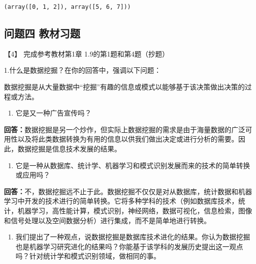 \documentclass[11pt]{article}
\makeatletter
\providecommand{\tightlist}{%
      \setlength{\itemsep}{0pt}\setlength{\parskip}{0pt}}
\newcommand{\boxspacing}{\kern\kvtcb@left@rule\kern\kvtcb@boxsep}
\newcommand{\prompt}[4]{
        \ttfamily\llap{{\color{#2}[#3]:\hspace{3pt}#4}}\vspace{-\baselineskip}
    }
\makeatother
\begin{document}
            \begin{tcolorbox}[breakable, size=fbox, boxrule=.5pt, pad at break*=1mm, opacityfill=0]
\prompt{Out}{outcolor}{29}{\boxspacing}
\begin{Verbatim}[commandchars=\\\{\}]
(array([0, 1, 2]), array([5, 6, 7]))
\end{Verbatim}
\end{tcolorbox}
        
    \hypertarget{ux95eeux9898ux56db-ux6559ux6750ux4e60ux9898}{%
\subsection{问题四
教材习题}\label{ux95eeux9898ux56db-ux6559ux6750ux4e60ux9898}}

    【4】 完成参考教材第1章 1.9的第1题和第4题（抄题）

    1.什么是数据挖掘？在你的回答中，强调以下问题：

    数据挖掘是从大量数据中``挖掘''有趣的信息或模式以能够基于该决策做出决策的过程或方法。

    \begin{enumerate}
\def\labelenumi{(\alph{enumi})}
\tightlist
\item
  它是又一种广告宣传吗？
\end{enumerate}

    \textbf{回答：}数据挖掘是另一个炒作，但实际上数据挖掘的需求是由于海量数据的广泛可用性以及将此类数据转换为有用的信息以供我们做出决定或进行分析的需要。因此，数据挖掘是信息技术发展的结果。

    \begin{enumerate}
\def\labelenumi{(\alph{enumi})}
\setcounter{enumi}{1}
\tightlist
\item
  它是一种从数据库、统计学、机器学习和模式识别发展而来的技术的简单转换或应用吗？
\end{enumerate}

    \textbf{回答：}不，数据挖掘远不止于此。数据挖掘不仅仅是对从数据库，统计数据和机器学习中开发的技术进行的简单转换。它将多种学科的技术（例如数据库技术，统计，机器学习，高性能计算，模式识别，神经网络，数据可视化，信息检索，图像和信号处理以及空间数据分析）进行集成，而不是简单地进行转换。

    \begin{enumerate}
\def\labelenumi{(\alph{enumi})}
\setcounter{enumi}{2}
\tightlist
\item
  我们提出了一种观点，说数据挖掘是数据库技术进化的结果。你认为数据挖掘也是机器学习研究进化的结果吗？你能基于该学科的发展历史提出这一观点吗？针对统计学和模式识别领域，做相同的事。
\end{enumerate}
\end{document}
